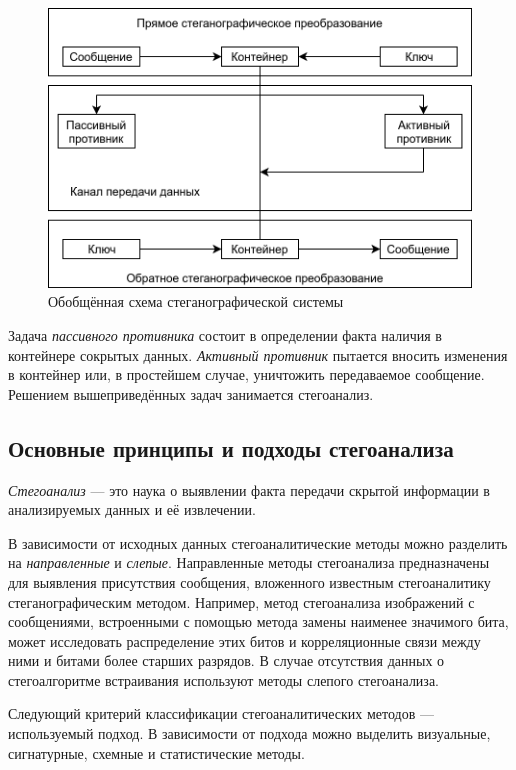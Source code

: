 \begin{figure}
\centering
\includegraphics[width=1\textwidth]{include/graphics/im_1-stego_system}
\caption{Обобщённая схема стеганографической системы}
\label{fig:StegoSystem}
\end{figure}

Задача \textit{пассивного противника} состоит в определении факта наличия в контейнере сокрытых данных. \textit{Активный противник} пытается вносить изменения в контейнер или, в простейшем случае, уничтожить передаваемое сообщение. Решением вышеприведённых задач занимается стегоанализ.

\subsection{Основные принципы и подходы стегоанализа}

\textit{Стегоанализ} — это наука о выявлении факта передачи скрытой информации в анализируемых данных и её извлечении.

В зависимости от исходных данных стегоаналитические методы можно разделить на \textit{направленные} и \textit{слепые}. Направленные методы стегоанализа предназначены для выявления присутствия сообщения, вложенного известным стегоаналитику стеганографическим методом. Например, метод стегоанализа изображений с сообщениями, встроенными с помощью метода замены наименее значимого бита, может исследовать распределение этих битов и корреляционные связи между ними и битами более старших разрядов. В случае отсутствия данных о стегоалгоритме встраивания используют методы слепого стегоанализа.

Следующий критерий классификации стегоаналитических методов — используемый подход. В зависимости от подхода можно выделить визуальные, сигнатурные, схемные и статистические методы.

